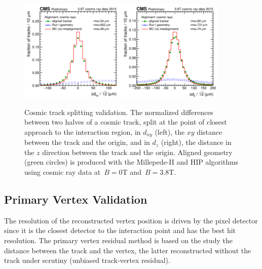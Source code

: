 \begin{figure}[htb]
    \begin{center}
        \includegraphics[width=0.45\textwidth]{../figs/Alignment/AlRes_CRAFT_hist_Delta_dxy.png}\includegraphics[width=0.45\textwidth]{../figs/Alignment/AlRes_CRAFT_hist_Delta_dz.png}
    \end{center}
    \caption{Cosmic track splitting validation. The normalized differences between two halves of a cosmic track, split at the point of closest approach to the interaction region, in $d_{xy}$ (left), the $xy$ distance between the track and the origin, and in $d_z$ (right), the distance in the $z$ direction between the track and the origin. Aligned geometry (green circles) is produced with the Millepede-II and HIP algorithms using cosmic ray data at~$B=0$T and~$B=3.8$T.}
    \label{fig:trackSplit}
\end{figure}

\subsection{Primary Vertex Validation}
\label{sec:AlRes_PVvalid}

The resolution of the reconstructed vertex position is driven by the pixel detector since it is the closest detector to the interaction point and has the best hit resolution. The primary vertex residual method is based on the study the distance between the track and the vertex, the latter reconstructed without the track under scrutiny (unbiased track-vertex residual). 

